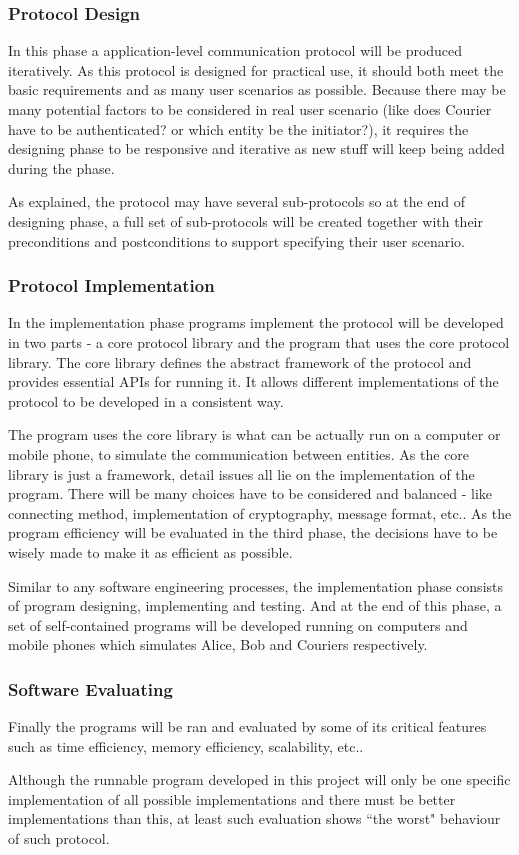 \documentclass[11pt,a4paper]{article}
\begin{document}
\subsubsection{Protocol Design}
In this phase a application-level communication protocol will be produced iteratively. As this protocol is designed for practical use, it should both meet the basic requirements and as many user scenarios as possible. Because there may be many potential factors to be considered in real user scenario (like does Courier have to be authenticated? or which entity be the initiator?), it requires the designing phase to be responsive and iterative as new stuff will keep being added during the phase.\par
As explained, the protocol may have several sub-protocols so at the end of designing phase, a full set of sub-protocols will be created together with their preconditions and postconditions to support specifying their user scenario.\par

\subsubsection{Protocol Implementation}
In the implementation phase programs implement the protocol will be developed in two parts - a core protocol library and the program that uses the core protocol library. The core library defines the abstract framework of the protocol and provides essential APIs for running it. It allows different implementations of the protocol to be developed in a consistent way.\par 
The program uses the core library is what can be actually run on a computer or mobile phone, to simulate the communication between entities. As the core library is just a framework, detail issues all lie on the implementation of the program. There will be many choices have to be considered and balanced - like connecting method, implementation of cryptography, message format, etc.. As the program efficiency will be evaluated in the third phase, the decisions have to be wisely made to make it as efficient as possible.\par 
Similar to any software engineering processes, the implementation phase consists of program designing, implementing and testing. And at the end of this phase, a set of self-contained programs will be developed running on computers and mobile phones which simulates Alice, Bob and Couriers respectively.

\subsubsection{Software Evaluating}
Finally the programs will be ran and evaluated by some of its critical features such as time efficiency, memory efficiency, scalability, etc.. \par 
Although the runnable program developed in this project will only be one specific implementation of all possible implementations and there must be better implementations than this, at least such evaluation shows ``the worst" behaviour of such protocol.
\end{document}
